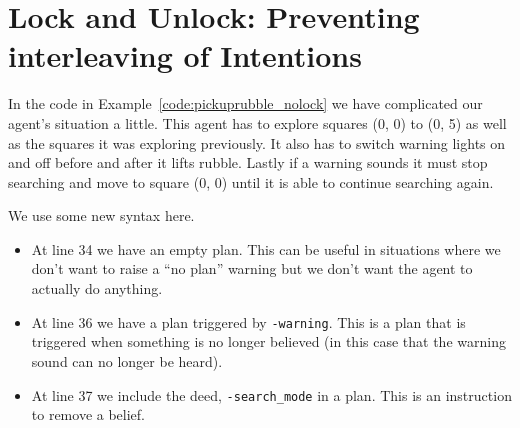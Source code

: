 \section{Lock and Unlock: Preventing interleaving of Intentions}
In the code in Example~\ref{code:pickuprubble_nolock} we have complicated our agent's situation a little.  This agent has to explore squares (0, 0) to (0, 5) as well as the squares it was exploring previously.  It also has to switch warning lights on and off before and after it lifts rubble.  Lastly if a warning sounds it must stop searching and move to square (0, 0) until it is able to continue searching again.

We use some new syntax here.  
\begin{itemize}
\item At line 34 we have an empty plan.  This can be useful in situations where we don't want to raise a ``no plan'' warning but we don't want the agent to actually do anything.
\item At line 36 we have a plan triggered by \lstinline{-warning}.  This is a plan that is triggered when something is no longer believed (in this case that the warning sound can no longer be heard).
\item At line 37 we include the deed, \lstinline{-search_mode} in a plan.  This is an instruction to remove a belief.
\end{itemize}

